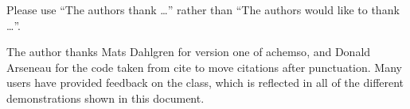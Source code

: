 \documentclass[journal=jacsat,manuscript=article]{achemso}
\begin{document}


\begin{acknowledgement}

Please use ``The authors thank \ldots'' rather than ``The
authors would like to thank \ldots''.

The author thanks Mats Dahlgren for version one of \textsf{achemso},
and Donald Arseneau for the code taken from \textsf{cite} to move
citations after punctuation. Many users have provided feedback on the
class, which is reflected in all of the different demonstrations
shown in this document.

\end{acknowledgement}
\end{document}
